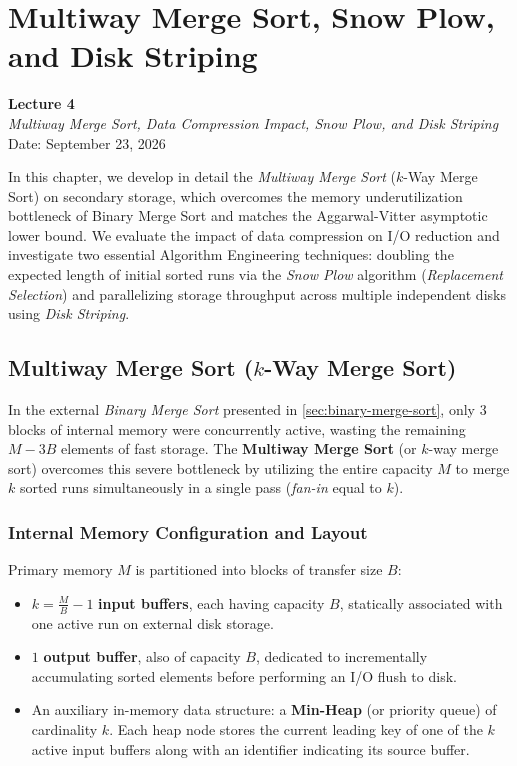 \chapter{Multiway Merge Sort, Snow Plow, and Disk Striping}
\label{cha:lecture-four}

\begin{center}
  \textbf{Lecture 4}\\
  \emph{Multiway Merge Sort, Data Compression Impact, Snow Plow, and Disk Striping}\\[0.5em]
  Date: September 23, 2026
\end{center}

In this chapter, we develop in detail the \textit{Multiway Merge Sort} ($k$-Way Merge Sort) on secondary storage, which overcomes the memory underutilization bottleneck of Binary Merge Sort and matches the Aggarwal-Vitter asymptotic lower bound. We evaluate the impact of data compression on I/O reduction and investigate two essential Algorithm Engineering techniques: doubling the expected length of initial sorted runs via the \textit{Snow Plow} algorithm (\textit{Replacement Selection}) and parallelizing storage throughput across multiple independent disks using \textit{Disk Striping}.

\section{Multiway Merge Sort (\texorpdfstring{$k$}{k}-Way Merge Sort)}
\label{sec:multiway-merge-sort}

In the external \textit{Binary Merge Sort} presented in \autoref{sec:binary-merge-sort}, only 3 blocks of internal memory were concurrently active, wasting the remaining $M - 3B$ elements of fast storage. The \textbf{Multiway Merge Sort} (or $k$-way merge sort) overcomes this severe bottleneck by utilizing the entire capacity $M$ to merge $k$ sorted runs simultaneously in a single pass (\textit{fan-in} equal to $k$).

\subsection{Internal Memory Configuration and Layout}
\label{subsec:multiway-memory-layout}

Primary memory $M$ is partitioned into blocks of transfer size $B$:
\begin{itemize}
  \item $k = \frac{M}{B} - 1$ \textbf{input buffers}, each having capacity $B$, statically associated with one active run on external disk storage.
  \item $1$ \textbf{output buffer}, also of capacity $B$, dedicated to incrementally accumulating sorted elements before performing an I/O flush to disk.
  \item An auxiliary in-memory data structure: a \textbf{Min-Heap} (or priority queue) of cardinality $k$. Each heap node stores the current leading key of one of the $k$ active input buffers along with an identifier indicating its source buffer.
\end{itemize}


